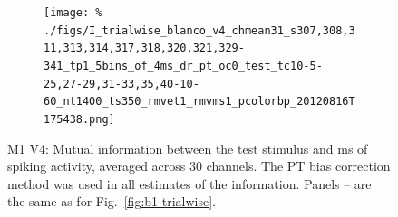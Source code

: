\begin{figure}[htbp]
\begin{subfigure}[b]{0.5\linewidth}
        \centering
        \caption{}
        \label{fig:b4-5x4tp1}
        \texttt{[image: \%
./figs/I\_trialwise\_blanco\_v4\_chmean31\_s307,308,311,313,314,317,318,320,321,329-341\_tp1\_5bins\_of\_4ms\_dr\_pt\_oc0\_test\_tc10-5-25,27-29,31-33,35,40-10-60\_nt1400\_ts350\_rmvet1\_rmvms1\_pcolorbp\_20120816T175438.png]}
    \end{subfigure}
    \caption{M1 V4: Mutual information between the test stimulus and \unit[20]{ms} of spiking activity, averaged across 30 channels.
The PT bias correction method was used in all estimates of the information.
Panels -- are the same as for Fig.~\ref{fig:b1-trialwise}.
}
    \label{fig:b4-trialwise}
\end{figure}




